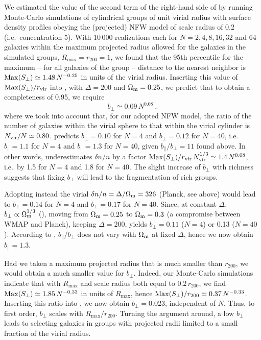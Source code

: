 We estimated the value of the second term of the right-hand side of
 by running Monte-Carlo simulations of cylindrical
groups of unit virial radius with surface density profiles obeying the
(projected) NFW model of scale radius of 0.2 (i.e.\ concentration 5). With
$10\,000$ realizations each for $N=2, 4, 8, 16, 32$ and 64 galaxies within  the
maximum projected radius allowed for the galaxies in the simulated groups,
$R_{\max}=r_{200} =1$, we found that the  95th percentile for the maximum {--}
for all galaxies of the group {--} distance to the nearest neighbor is ${\rm
Max}(S_\perp) \simeq 1.48\,N^{-0.25}$ in units of the virial radius.
%
Inserting this value of ${\rm Max}(S_\perp)/r_{{\rm vir}}$ into
, with $\Delta=200$ and $\Omega_{\rm m}=0.25$, we
predict that to obtain a completeness of 0.95, we require
%
\begin{equation}
    b_\perp \simeq 0.09\,N^{0.08} \ ,
    \label{eq:bperppred3}
\end{equation}
%
where we took into account that, for our adopted NFW model, the ratio of the
number of galaxies within the virial sphere to that within the virial cylinder
is $N_{\rm vir}/N\simeq 0.80$.  predicts
$b_\perp=0.10$ for $N=4$ and $b_\perp=0.12$ for $N=40$, i.e. $b_\parallel=1.1$
for $N=4$ and $b_\parallel=1.3$ for $N=40$, given $b_\parallel/b_\perp=11$
found above. In other words,  underestimates
$\delta n/n$ by a factor ${\rm Max}(S_\perp)/r_{{\rm vir}}\,N_{\rm vir}^{1/3}
\simeq 1.4\,N^{0.08}$, i.e.\ by 1.5 for $N=4$ and 1.8 for $N=40$. The slight
increase of $b_\perp$ with richness suggests that fixing $b_\perp$ will lead to
the fragmentation of rich groups.

Adopting instead the virial $\delta n/n = \Delta/\Omega_{\rm m} = 326$ (Planck,
see above) would lead to $b_\perp = 0.14$ for $N=4$ and $b_\perp=0.17$ for
$N=40$. Since, at constant $\Delta$, $b_\perp \propto \Omega_{\rm m}^{1/3}$
(), moving from $\Omega_{\rm m}=0.25$ to
$\Omega_{\rm m}=0.3$ (a compromise between WMAP and Planck), keeping
$\Delta=200$,  yields $b_\perp=0.11$ ($N=4$) or 0.13 ($N=40$). According to
, $b_\parallel/b_\perp$ does not vary with
$\Omega_{\rm m}$ at fixed $\Delta$, hence we now obtain $b_\parallel = 1.3$.

Had we taken a maximum projected  radius that is much smaller than $r_{200}$,
we would obtain a much smaller value for $b_\perp$. Indeed, our Monte-Carlo
simulations indicate that with $R_{\max}$ and scale radius both equal to
$0.2\,r_{200}$, we find ${\rm Max}(S_\perp) \simeq 1.85\,N^{-0.33}$ in units of
$R_{\max}$, hence ${\rm Max}(S_\perp)/r_{200} \simeq 0.37\,N^{-0.33}$.
Inserting this ratio into , we now obtain $b_\perp
= 0.023$, independent of $N$. Thus, to first order, $b_\perp$ scales with
$R_{\max}/r_{200}$. Turning the argument around, a low $b_\perp$ leads to
selecting galaxies in groups with projected radii limited to a small fraction
of the virial radius.

